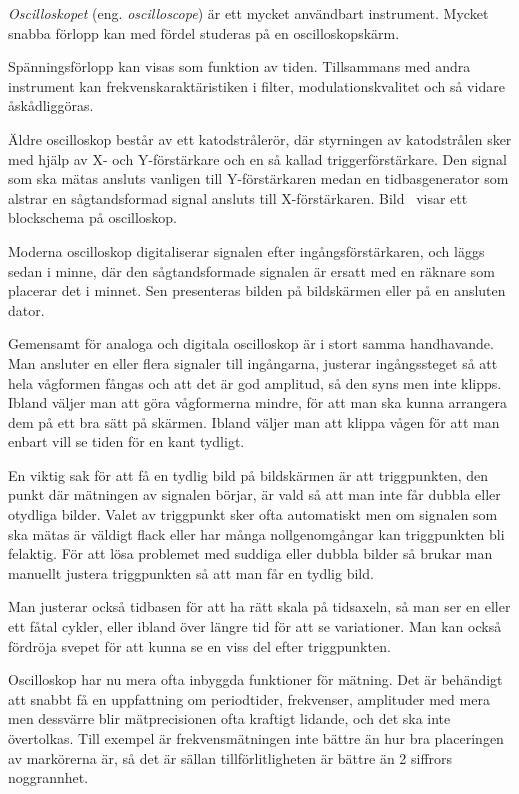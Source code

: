
\emph{Oscilloskopet} (eng. \emph{oscilloscope}) är ett mycket användbart
instrument.
Mycket snabba förlopp kan med fördel studeras på en oscilloskopskärm.

Spänningsförlopp kan visas som funktion av tiden.
Tillsammans med andra instrument kan frekvenskaraktäristiken i filter,
modulationskvalitet och så vidare åskådliggöras.

Äldre oscilloskop består av ett katodstrålerör, där styrningen av katodstrålen
sker med hjälp av X- och Y-förstärkare och en så kallad triggerförstärkare.
Den signal som ska mätas ansluts vanligen till Y-förstärkaren medan en
tidbasgenerator som alstrar en sågtandsformad signal ansluts till X-förstärkaren.
Bild~ visar ett blockschema på oscilloskop.

Moderna oscilloskop digitaliserar signalen efter ingångsförstärkaren,
och läggs sedan i minne, där den sågtandsformade signalen är ersatt med en
räknare som placerar det i minnet.
Sen presenteras bilden på bildskärmen eller på en ansluten dator.

Gemensamt för analoga och digitala oscilloskop är i stort samma handhavande.
Man ansluter en eller flera signaler till ingångarna, justerar ingångssteget
så att hela vågformen fångas och att det är god amplitud, så den syns men inte
klipps.
Ibland väljer man att göra vågformerna mindre, för att man ska kunna
arrangera dem på ett bra sätt på skärmen.
Ibland väljer man att klippa vågen för att man enbart vill se tiden för en
kant tydligt.

En viktig sak för att få en tydlig bild på bildskärmen är att triggpunkten,
den punkt där mätningen av signalen börjar, är vald så att man inte får dubbla
eller otydliga bilder.
Valet av triggpunkt sker ofta automatiskt men om signalen som ska mätas är
väldigt flack eller har många nollgenomgångar kan triggpunkten bli felaktig.
För att lösa problemet med suddiga eller dubbla bilder så brukar man manuellt
justera triggpunkten så att man får en tydlig bild.

Man justerar också tidbasen för att ha rätt skala på tidsaxeln, så man ser en
eller ett fåtal cykler, eller ibland över längre tid för att se variationer.
Man kan också fördröja svepet för att kunna se en viss del efter triggpunkten.

Oscilloskop har nu mera ofta inbyggda funktioner för mätning.
Det är behändigt att snabbt få en uppfattning om periodtider, frekvenser,
amplituder med mera men dessvärre blir mätprecisionen ofta kraftigt lidande,
och det ska inte övertolkas.
Till exempel är frekvensmätningen inte bättre än hur bra placeringen av
markörerna är, så det är sällan tillförlitligheten är bättre än 2 siffrors
noggrannhet.

